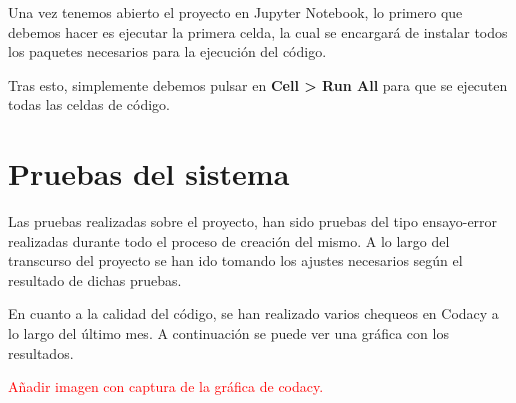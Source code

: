 Una vez tenemos abierto el proyecto en Jupyter Notebook, lo primero que debemos hacer es ejecutar la primera celda, la cual se encargará de instalar todos los paquetes necesarios para la ejecución del código.


Tras esto, simplemente debemos pulsar en \textbf{Cell > Run All} para que se ejecuten todas las celdas de código.



\section{Pruebas del sistema}

Las pruebas realizadas sobre el proyecto, han sido pruebas del tipo ensayo-error realizadas durante todo el proceso de creación del mismo. A lo largo del transcurso del proyecto se han ido tomando los ajustes necesarios según el resultado de dichas pruebas.

En cuanto a la calidad del código, se han realizado varios chequeos en Codacy a lo largo del último mes. A continuación se puede ver una gráfica con los resultados.

\textcolor{red}{Añadir imagen con captura de la gráfica de codacy.}
